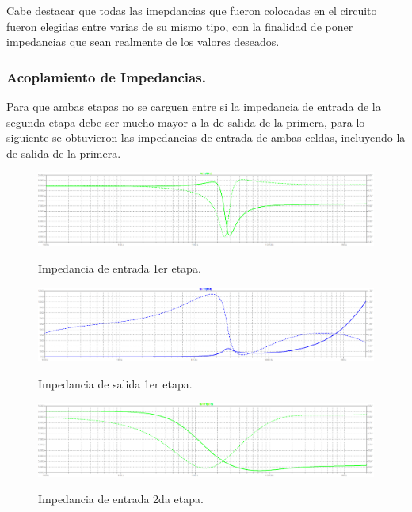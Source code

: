 Cabe destacar que todas las imepdancias que fueron colocadas en el circuito fueron elegidas entre varias de su mismo tipo, con la finalidad de poner impedancias que sean realmente de los valores deseados.

\subsubsection{Acoplamiento de Impedancias.}

Para que ambas etapas no se carguen entre si la impedancia de entrada de la segunda etapa debe ser mucho mayor a la de salida de la primera, para lo siguiente se obtuvieron las impedancias de entrada de ambas celdas, incluyendo la de salida de la primera.
\begin{figure}[H]
	\centering
	\includegraphics[width=\textwidth]{Imagenes-Ej2/ZinE1.png}
	\label{fig:graph}
	\caption{Impedancia de entrada 1er etapa.}
\end{figure}

\begin{figure}[H]
	\centering
	\includegraphics[width=\textwidth]{Imagenes-Ej2/ZoutE1.png}
	\label{fig:graph}
	\caption{Impedancia de salida 1er etapa.}
\end{figure}


\begin{figure}[H]
	\centering
	\includegraphics[width=\textwidth]{Imagenes-Ej2/ZinE2.png}
	\label{fig:graph}
	\caption{Impedancia de entrada 2da etapa.}
\end{figure}

